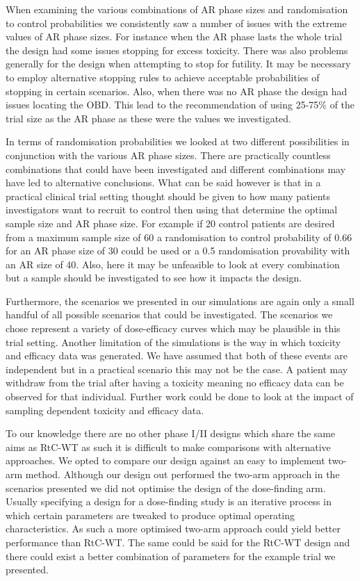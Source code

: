 When examining the various combinations of AR phase sizes and randomisation to control probabilities we consistently saw a number of issues with the extreme values of AR phase sizes. For instance when the AR phase lasts the whole trial the design had some issues stopping for excess toxicity. There was also problems generally for the design when attempting to stop for futility. It may be necessary to employ alternative stopping rules to achieve acceptable probabilities of stopping in certain scenarios. Also, when there was no AR phase the design had issues locating the OBD. This lead to the recommendation of using 25-75\% of the trial size as the AR phase as these were the values we investigated. 

In terms of randomisation probabilities we looked at two different possibilities in conjunction with the various AR phase sizes. There are practically countless combinations that could have been investigated and different combinations may have led to alternative conclusions. What can be said however is that in a practical clinical trial setting thought should be given to how many patients investigators want to recruit to control then using that determine the optimal sample size and AR phase size. For example if 20 control patients are desired from a maximum sample size of 60 a randomisation to control probability of 0.66 for an AR phase size of 30 could be used or a 0.5 randomisation provability with an AR size of 40. Also, here it may be unfeasible to look at every combination but a sample should be investigated to see how it impacts the design. 

Furthermore, the scenarios we presented in our simulations are again only a small handful of all possible scenarios that could be investigated. The scenarios we chose represent a variety of dose-efficacy curves which may be plausible in this trial setting. Another limitation of the simulations is the way in which toxicity and efficacy data was generated. We have assumed that both of these events are independent but in a practical scenario this may not be the case. A patient may withdraw from the trial after having a toxicity meaning no efficacy data can be observed for that individual. Further work could be done to look at the impact of sampling dependent toxicity and efficacy data. 

To our knowledge there are no other phase \RN{1}/\RN{2} designs which share the same aims as RtC-WT as such it is difficult to make comparisons with alternative approaches. We opted to compare our design against an easy to implement two-arm method. Although our design out performed the two-arm approach in the scenarios presented we did not optimise the design of the dose-finding arm. Usually specifying a design for a dose-finding study is an iterative process in which certain parameters are tweaked to produce optimal operating characteristics. As such a more optimised two-arm approach could yield better performance than RtC-WT. The same could be said for the RtC-WT design and there could exist a better combination of parameters for the example trial we presented. 


